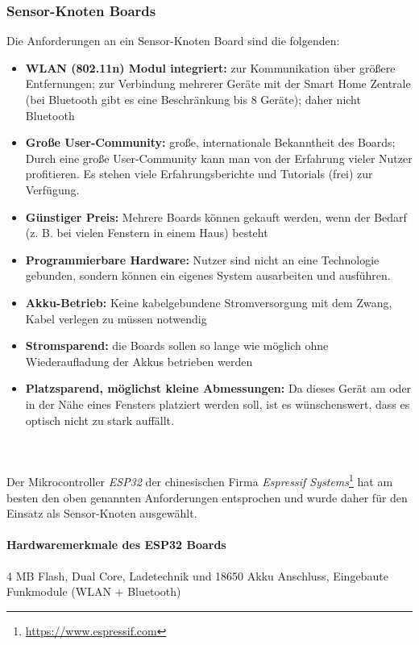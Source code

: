 \documentclass[a4paper,10pt,twocolumn]{article}
\begin{document}
\subsubsection{Sensor-Knoten Boards} 
Die Anforderungen an ein Sensor-Knoten Board sind die folgenden:
\begin{itemize}
    \item \textbf{WLAN (802.11n) Modul integriert:} zur Kommunikation über größere Entfernungen; zur Verbindung mehrerer Geräte mit der Smart Home Zentrale (bei Bluetooth gibt es eine Beschränkung bis 8 Geräte); daher nicht Bluetooth
    \item \textbf{Große User-Community:} große, internationale Bekanntheit des Boards; Durch eine große User-Community kann man von der Erfahrung vieler Nutzer profitieren. Es stehen viele Erfahrungsberichte und Tutorials (frei) zur Verfügung.
    \item \textbf{Günstiger Preis:} Mehrere Boards können gekauft werden, wenn der Bedarf (z. B. bei vielen Fenstern in einem Haus) besteht
    \item \textbf{Programmierbare Hardware:} Nutzer sind nicht an eine Technologie gebunden, sondern können ein eigenes System ausarbeiten und ausführen.
    \item \textbf{Akku-Betrieb:} Keine kabelgebundene Stromversorgung mit dem Zwang, Kabel verlegen zu müssen notwendig
    \item \textbf{Stromsparend:} die Boards sollen so lange wie möglich ohne Wiederaufladung der Akkus betrieben werden
    \item \textbf{Platzsparend, möglichst kleine Abmessungen:} Da dieses Gerät am oder in der Nähe eines Fensters platziert werden soll, ist es wünschenswert, dass es optisch nicht zu stark auffällt.
\end{itemize}\\\\
Der Mikrocontroller \textit{ESP32} der chinesischen Firma \textit{Espressif Systems}\footnote{\url{https://www.espressif.com}} hat am besten den oben genannten Anforderungen entsprochen und wurde daher für den Einsatz als Sensor-Knoten ausgewählt.
\paragraph{Hardwaremerkmale des ESP32 Boards} 4 MB Flash, Dual Core, Ladetechnik und 18650 Akku Anschluss, Eingebaute Funkmodule (WLAN + Bluetooth)
\end{document}
